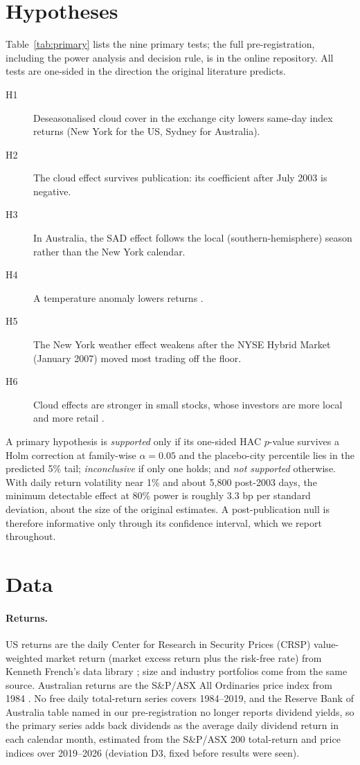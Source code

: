 \documentclass[11pt]{article}
\begin{document}
\section{Hypotheses}

Table~\ref{tab:primary} lists the nine primary tests; the full pre-registration, including the
power analysis and decision rule, is in the online repository. All tests are one-sided in the
direction the original literature predicts.

\begin{description}
\item[H1] Deseasonalised cloud cover in the exchange city lowers same-day index returns (New York
for the US, Sydney for Australia).
\item[H2] The cloud effect survives publication: its coefficient after July 2003 is negative.
\item[H3] In Australia, the SAD effect follows the local (southern-hemisphere) season rather than
the New York calendar.
\item[H4] A temperature anomaly lowers returns \citep{cao2005}.
\item[H5] The New York weather effect weakens after the NYSE Hybrid Market (January 2007) moved
most trading off the floor.
\item[H6] Cloud effects are stronger in small stocks, whose investors are more local and more
retail \citep{loughran2004}.
\end{description}

\noindent A primary hypothesis is \emph{supported} only if its one-sided HAC $p$-value survives a
Holm correction at family-wise $\alpha=0.05$ and the placebo-city percentile lies in the predicted
5\% tail; \emph{inconclusive} if only one holds; and \emph{not supported} otherwise. With daily
return volatility near 1\% and about 5,800 post-2003 days, the minimum detectable effect at 80\%
power is roughly 3.3 bp per standard deviation, about the size of the original estimates. A
post-publication null is therefore informative only through its confidence interval, which we
report throughout.

\section{Data}

\paragraph{Returns.} US returns are the daily Center for Research in Security Prices (CRSP)
value-weighted market return (market excess return plus the risk-free rate) from Kenneth French's
data library \citep{french_data}; size and industry portfolios come from the same source.
Australian returns are the S\&P/ASX All Ordinaries price index from 1984 \citep{yahoo}. No free
daily total-return series covers 1984--2019, and the Reserve Bank of Australia table named in our
pre-registration no longer reports dividend yields, so the primary series adds back dividends as
the average daily dividend return in each calendar month, estimated from the S\&P/ASX 200
total-return and price indices over 2019--2026 (deviation D3, fixed before results were seen).
\end{document}
